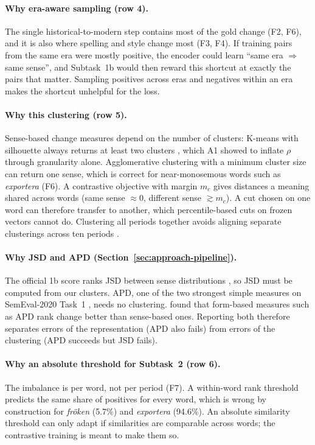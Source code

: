 \paragraph{Why era-aware sampling (row 4).} The single historical-to-modern step contains most of
the gold change (F2, F6), and it is also where spelling and style change most (F3, F4). If
training pairs from the same era were mostly positive, the encoder could learn ``same era $\Rightarrow$
same sense'', and Subtask~1b would then reward this shortcut at exactly the pairs that matter. Sampling
positives across eras and negatives within an era makes the shortcut unhelpful for the loss.

\paragraph{Why this clustering (row 5).} Sense-based change measures depend on the number of
clusters: K-means with silhouette always returns at least two clusters
\citep{giulianelli2020analysing,rousseeuw1987silhouettes}, which A1 showed to inflate
$\rho$ through granularity alone. Agglomerative clustering with a minimum cluster size can
return one sense, which is correct for near-monosemous words such as \textit{exportera}
(F6). A contrastive objective with margin $m_c$ gives distances a meaning shared across words
(same sense $\approx 0$, different sense $\gtrsim m_c$). A cut chosen on one word can therefore
transfer to another, which percentile-based cuts on frozen vectors cannot do. Clustering all
periods together avoids aligning separate clusterings across ten periods
\citep{periti2024towards}.

\paragraph{Why JSD and APD (Section~\ref{sec:approach-pipeline}).} The official 1b score ranks
JSD between sense distributions \citep{lin1991divergence}, so JSD must be computed from our
clusters. APD, one of the two strongest simple measures on SemEval-2020 Task~1
\citep{schlechtweg2020semeval,kutuzov2020uio}, needs no clustering. \citet{periti2024systematic}
found that form-based measures such as APD rank change better than sense-based ones. Reporting
both therefore separates errors of the representation (APD also fails) from errors of the
clustering (APD succeeds but JSD fails).

\paragraph{Why an absolute threshold for Subtask~2 (row 6).} The imbalance is per word, not per
period (F7). A within-word rank threshold predicts the same share of positives for every word,
which is wrong by construction for \textit{fröken} (5.7\%) and \textit{exportera} (94.6\%).
An absolute similarity threshold can only adapt if similarities are comparable across words;
the contrastive training is meant to make them so.
